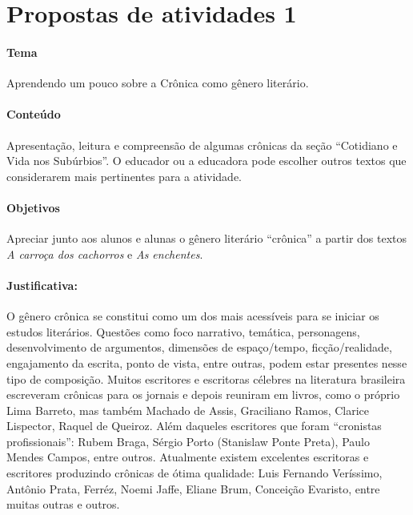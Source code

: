 \documentclass{article}
\begin{document}
\section{Propostas de atividades 1}







\paragraph{Tema} Aprendendo um pouco sobre a Crônica como gênero
  literário.


\paragraph{Conteúdo} Apresentação, leitura e compreensão de algumas
crônicas da seção ``Cotidiano e Vida nos Subúrbios''. O educador ou a
educadora pode escolher outros textos que considerarem mais pertinentes
para a atividade.


\paragraph{Objetivos} Apreciar junto aos alunos e alunas o gênero
literário ``crônica'' a partir dos textos {\textit{A carroça dos
cachorros}} e {\textit{As enchentes}.}

\reversemarginpar
\marginparwidth=3cm



\paragraph{Justificativa:} O gênero crônica se constitui como um dos mais
acessíveis para se iniciar os estudos literários. Questões como foco
narrativo, temática, personagens, desenvolvimento de argumentos,
dimensões de espaço/tempo, ficção/realidade, engajamento da escrita,
ponto de vista, entre outras, podem estar presentes nesse tipo de
composição. Muitos escritores e escritoras célebres na literatura
brasileira escreveram crônicas para os jornais e depois reuniram em
livros, como o próprio Lima Barreto, mas também Machado de Assis,
Graciliano Ramos, Clarice Lispector, Raquel de Queiroz. Além daqueles
escritores que foram ``cronistas profissionais'': Rubem Braga, Sérgio
Porto (Stanislaw Ponte Preta), Paulo Mendes Campos, entre outros.
Atualmente existem excelentes escritoras e escritores produzindo
crônicas de ótima qualidade: Luis Fernando Veríssimo, Antônio Prata,
Ferréz, Noemi Jaffe, Eliane Brum, Conceição Evaristo, entre muitas
outras e outros.
\end{document}
